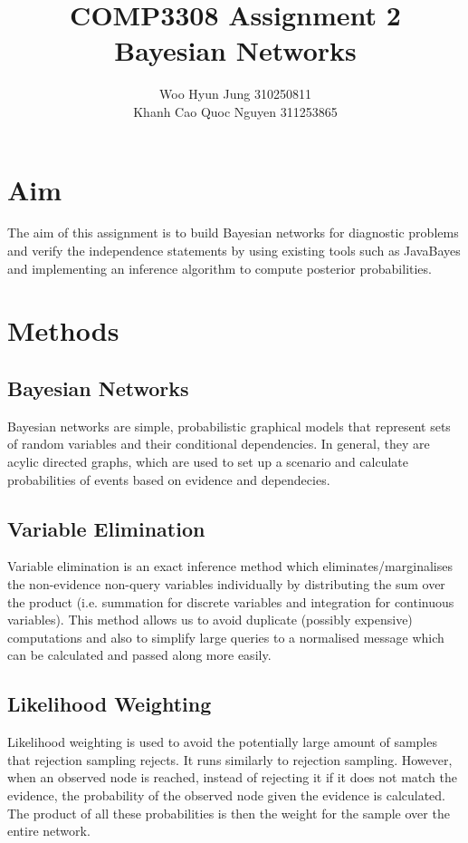 \documentclass{article}
\title{COMP3308 Assignment 2 \\ Bayesian Networks}
\author{Woo Hyun Jung 310250811 \\  Khanh Cao Quoc Nguyen 311253865}
\date{}
\begin{document}
\maketitle
\thispagestyle{empty}
\newpage

\section{Aim}
The aim of this assignment is to build Bayesian networks for diagnostic problems and verify the independence statements by using existing tools such as JavaBayes and implementing an inference algorithm to compute posterior probabilities.

\section{Methods}
\subsection{Bayesian Networks}
Bayesian networks are simple, probabilistic graphical models that represent sets of random variables and their conditional dependencies. In general, they are acylic directed graphs, which are used to set up a scenario and calculate probabilities of events based on evidence and dependecies.

\subsection{Variable Elimination}
Variable elimination is an exact inference method which eliminates/marginalises the non-evidence non-query variables individually by distributing the sum over the product (i.e. summation for discrete variables and integration for continuous variables). This method allows us to avoid duplicate (possibly expensive) computations and also to simplify large queries to a normalised message which can be calculated and passed along more easily.

\subsection{Likelihood Weighting}
Likelihood weighting is used to avoid the potentially large amount of samples that rejection sampling rejects. It runs similarly to rejection sampling. However, when an observed node is reached, instead of rejecting it if it does not match the evidence, the probability of the observed node given the evidence is calculated. The product of all these probabilities is then the weight for the sample over the entire network. 
\end{document}
